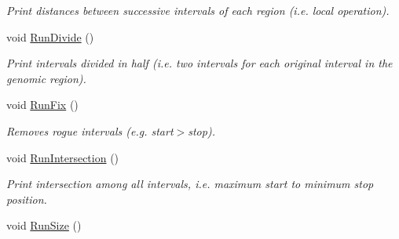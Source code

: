 \begin{CompactItemize}
\begin{CompactList}\small\item\em Print distances between successive intervals of each region (i.e. local operation). \item\end{CompactList}\item 
\hypertarget{classGenomicRegionSet_9acb3424739ed62c0efddad01536ad18}{
void \hyperlink{classGenomicRegionSet_9acb3424739ed62c0efddad01536ad18}{RunDivide} ()}
\label{classGenomicRegionSet_9acb3424739ed62c0efddad01536ad18}

\begin{CompactList}\small\item\em Print intervals divided in half (i.e. two intervals for each original interval in the genomic region). \item\end{CompactList}\item 
\hypertarget{classGenomicRegionSet_efa09dc62c768a06e4ca1f56fd683be5}{
void \hyperlink{classGenomicRegionSet_efa09dc62c768a06e4ca1f56fd683be5}{RunFix} ()}
\label{classGenomicRegionSet_efa09dc62c768a06e4ca1f56fd683be5}

\begin{CompactList}\small\item\em Removes rogue intervals (e.g. start$>$stop). \item\end{CompactList}\item 
\hypertarget{classGenomicRegionSet_e598cd9c5f94555a04e43f9fe6334aec}{
void \hyperlink{classGenomicRegionSet_e598cd9c5f94555a04e43f9fe6334aec}{RunIntersection} ()}
\label{classGenomicRegionSet_e598cd9c5f94555a04e43f9fe6334aec}

\begin{CompactList}\small\item\em Print intersection among all intervals, i.e. maximum start to minimum stop position. \item\end{CompactList}\item 
\hypertarget{classGenomicRegionSet_b1e96bd7781dac63a1745a8cf5ac5538}{
void \hyperlink{classGenomicRegionSet_b1e96bd7781dac63a1745a8cf5ac5538}{RunSize} ()}
\label{classGenomicRegionSet_b1e96bd7781dac63a1745a8cf5ac5538}


\end{CompactItemize}
